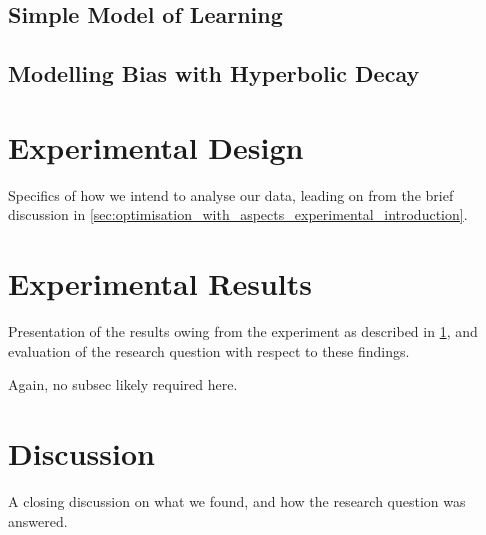
\subsection{Simple Model of Learning}\label{subsec:optimisation_with_aspects_basiclearningaspect}





\subsection{Modelling Bias with Hyperbolic Decay}\label{subsec:optimisation_with_aspects_hyperbolicdecay}




\section{Experimental Design}\label{sec:optimisation_with_aspects_experimental_design}

Specifics of how we intend to analyse our data, leading on from the brief
discussion in \cref{sec:optimisation_with_aspects_experimental_introduction}.



\section{Experimental Results}\label{sec:optimisation_with_aspects_experimental_results}

Presentation of the results owing from the experiment as described in
\cref{sec:optimisation_with_aspects_experimental_design}, and evaluation of the
research question with respect to these findings.

Again, no subsec likely required here.

\section{Discussion}\label{sec:optimisation_with_aspects_discussion}

A closing discussion on what we found, and how the research question was
answered.